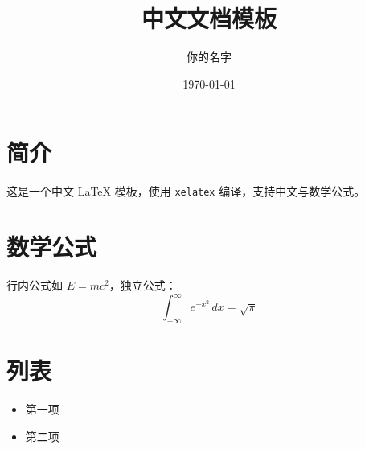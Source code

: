 \documentclass[UTF8,a4paper,12pt]{ctexart}
\title{中文文档模板}
\author{你的名字}
\date{\today}
\begin{document}
\maketitle

\section{简介}
这是一个中文 \LaTeX{} 模板，使用 \texttt{xelatex} 编译，支持中文与数学公式。

\section{数学公式}
行内公式如 $E = mc^2$，独立公式：
\begin{equation}
    \int_{-\infty}^{\infty} e^{-x^2}\,dx = \sqrt{\pi}
\end{equation}

\section{列表}
\begin{itemize}
    \item 第一项
    \item 第二项
\end{itemize}
\end{document}
